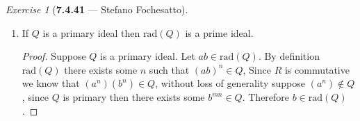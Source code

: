 \documentclass[12pt]{amsart}
\theoremstyle{remark}
\newtheorem*{exercise}{Exercise}%
\theoremstyle{mycomment}
\begin{document}
\begin{exercise}[\textbf{7.4.41} --- Stefano Fochesatto]
\begin{enumerate}
\item[(d)] If $Q$ is a primary ideal then $\text{rad}(Q)$ is a prime ideal. 
\begin{proof} Suppose $Q$ is a primary ideal. Let $ab \in \text{rad}(Q)$. By definition $\text{rad}(Q)$ there exists some $n$ such that $(ab)^n \in Q$, 
  Since $R$ is commutative we know that $(a^n)(b^n) \in Q$, without loss of generality suppose $(a^n) \not\in Q$, since $Q$ is primary then there exists some 
  $b^{mn} \in Q$. Therefore $b \in \text{rad}(Q)$.
\end{proof}


  \end{enumerate}
\end{exercise}
\vspace{.5in}
\end{document}
